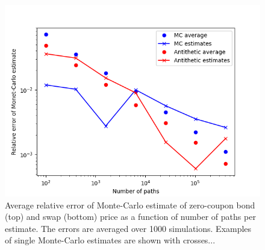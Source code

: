\begin{figure}
\centering
\includegraphics[scale=0.7]{figures/hw_1f_zero_coupon_bond/mc_error_ZCBond.png}
\caption{Average relative error of Monte-Carlo estimate of zero-coupon bond (top) and swap (bottom) price as a function of number of paths per estimate. The errors are averaged over 1000 simulations. Examples of single Monte-Carlo estimates are shown with crosses...}
\end{figure}

